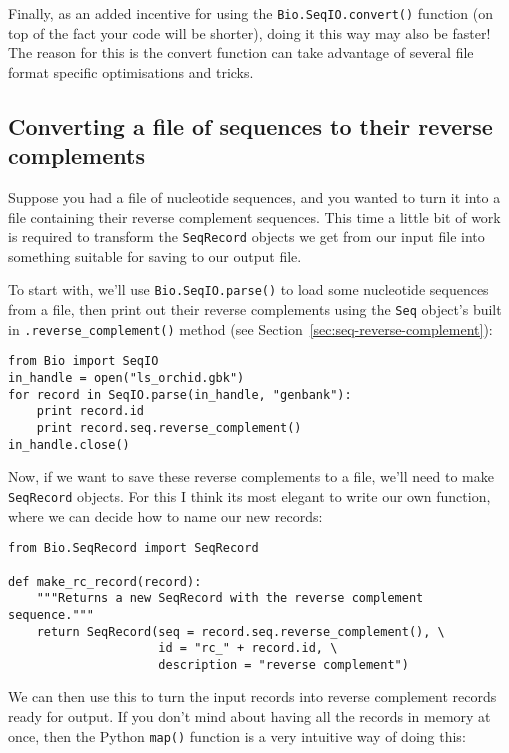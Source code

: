 \documentclass{report}
\begin{document}
Finally, as an added incentive for using the \verb|Bio.SeqIO.convert()| function
(on top of the fact your code will be shorter), doing it this way may also be
faster! The reason for this is the convert function can take advantage of
several file format specific optimisations and tricks.

\subsection{Converting a file of sequences to their reverse complements}
\label{sec:SeqIO-reverse-complement}
Suppose you had a file of nucleotide sequences, and you wanted to turn it into a file containing their reverse complement sequences.  This time a little bit of work is required to transform the \verb|SeqRecord| objects we get from our input file into something suitable for saving to our output file.

To start with, we'll use \verb|Bio.SeqIO.parse()| to load some nucleotide
sequences from a file, then print out their reverse complements using
the \verb|Seq| object's built in \verb|.reverse_complement()| method (see Section~\ref{sec:seq-reverse-complement}):

\begin{verbatim}
from Bio import SeqIO
in_handle = open("ls_orchid.gbk")
for record in SeqIO.parse(in_handle, "genbank"):
    print record.id
    print record.seq.reverse_complement()
in_handle.close()
\end{verbatim}

Now, if we want to save these reverse complements to a file, we'll need to make \verb|SeqRecord| objects.
For this I think its most elegant to write our own function, where we can decide how to name our
new records:

\begin{verbatim}
from Bio.SeqRecord import SeqRecord

def make_rc_record(record):
    """Returns a new SeqRecord with the reverse complement sequence."""
    return SeqRecord(seq = record.seq.reverse_complement(), \
                     id = "rc_" + record.id, \
                     description = "reverse complement")
\end{verbatim}

We can then use this to turn the input records into reverse complement records ready for output.  If you don't mind about having all the records in memory at once, then the Python \verb|map()| function is a very intuitive way of doing this:
\end{document}
